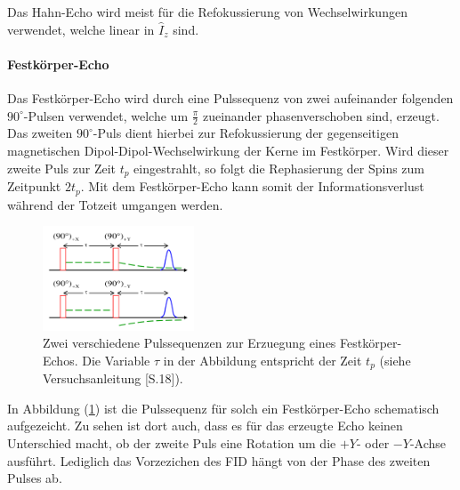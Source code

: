 Das Hahn-Echo wird meist f\"{u}r die Refokussierung von Wechselwirkungen verwendet, welche linear in $\widehat{I}_z$ sind.

\paragraph{Festk\"{o}rper-Echo}
Das Festk\"{o}rper-Echo wird durch eine Pulssequenz von zwei aufeinan{\-}der folgenden $90^{\circ}$-Pulsen verwendet, welche um $\frac{\pi}{2}$ zueinander phasenverschoben sind, erzeugt.
Das zweiten $90^{\circ}$-Puls dient hierbei zur Refokussierung der gegenseitigen magne{\-}tisch{\-}en Dipol-Dipol-Wechselwirkung der Kerne im Festkörper.
Wird dieser zweite Puls zur Zeit $t_p$ eingestrahlt, so folgt die Rephasierung der Spins zum Zeitpunkt $2 t_p$.
Mit dem Festk\"{o}rper-Echo kann somit der Informationsverlust w\"{a}hrend der Totzeit umgangen werden.
\begin{figure}
\centering
	\includegraphics[width=0.4\textwidth]{Plots/festkoerperecho2.png}
	\caption{Zwei verschiedene Pulssequenzen zur Erzuegung eines Festk\"{o}rper-Echos. Die Variable $\tau$ in der Abbildung entspricht der Zeit $t_p$ (siehe Versuchsanleitung \cite{Anleitung}[S.18]).}
	\label{FK_echo.}
\end{figure}
In Abbildung (\ref{FK_echo.}) ist die Pulssequenz f\"{u}r solch ein Festk\"{o}rper-Echo schematisch aufgezeicht.
Zu sehen ist dort auch, dass es f\"{u}r das erzeugte Echo keinen Unterschied macht, ob der zweite Puls eine Rotation um die $+Y$- oder $-Y$-Achse ausf\"{u}hrt.
Lediglich das Vorzezichen des FID h\"{a}ngt von der Phase des zweiten Pulses ab.

